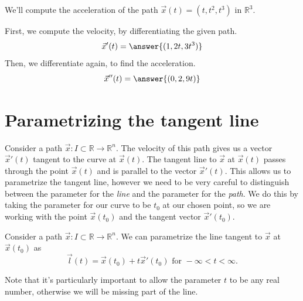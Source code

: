 \documentclass{ximera}
\begin{document}
\begin{example}
We'll compute the acceleration of the path $\vec{x}(t) = (t,t^2,t^3)$ in $\mathbb{R}^3$.

First, we compute the velocity, by differentiating the given path.
\[
\vec{x}'(t) = \answer{(1,2t,3t^3)}
\]
Then, we differentiate again, to find the acceleration.
\[
\vec{x}''(t) = \answer{(0,2,9t)}
\]
\end{example}


\section*{Parametrizing the tangent line}

Consider a path $\vec{x}:I\subset\mathbb{R}\rightarrow\mathbb{R}^n$. The velocity of this path gives us a vector $\vec{x}'(t)$ tangent to the curve at $\vec{x}(t)$. The tangent line to $\vec{x}$ at $\vec{x}(t)$ passes through the point $\vec{x}(t)$ and is parallel to the vector $\vec{x}'(t)$. This allows us to parametrize the tangent line, however we need to be very careful to distinguish between the parameter for the \emph{line} and the parameter for the \emph{path}. We do this by taking the parameter for our curve to be $t_0$ at our chosen point, so we are working with the point $\vec{x}(t_0)$ and the tangent vector $\vec{x}'(t_0)$.

\begin{proposition}
Consider a path $\vec{x}:I\subset\mathbb{R}\rightarrow\mathbb{R}^n$. We can parametrize the line tangent to $\vec{x}$ at $\vec{x}(t_0)$ as
\[
\vec{l}(t) = \vec{x}(t_0) + t\vec{x}'(t_0) \textrm{ for } -\infty < t < \infty.
\]
\end{proposition}

Note that it's particularly important to allow the parameter $t$ to be any real number, otherwise we will be missing part of the line.
\end{document}
